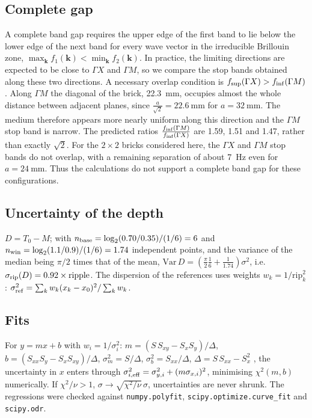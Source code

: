 \documentclass[9pt,a4paper,twocolumn]{extarticle}
\newcommand{\GX}{\ensuremath{\Gamma X}}
\newcommand{\GM}{\ensuremath{\Gamma M}}
\begin{document}
\subsection*{Complete gap}
A complete band gap requires the upper edge of the first band to lie below the lower edge of the next band for every wave vector in the irreducible Brillouin zone, $\max_{\mathbf k} f_1(\mathbf k) < \min_{\mathbf k} f_2(\mathbf k)$. In practice, the limiting directions are expected to be close to \GX{} and \GM{}, so we compare the stop bands obtained along these two directions. A necessary overlap condition is $f_{\rm sup}(\GX) > f_{\rm inf}(\GM)$. Along \GM{} the diagonal of the brick, \SI{22.3}{\milli\metre}, occupies almost the whole distance between adjacent planes, since $\frac{a}{\sqrt{2}}=\SI{22.6}{\milli\metre}$ for $a=\SI{32}{\milli\metre}$. The medium therefore appears more nearly uniform along this direction and the \GM{} stop band is narrow. The predicted ratios $\frac{f_{\rm inf}(\GM)}{f_{\rm inf}(\GX)}$ are 1.59, 1.51 and 1.47, rather than exactly \(\sqrt{2}\). For the \(2\times2\) bricks considered here, the \GX{} and \GM{} stop bands do not overlap, with a remaining separation of about \SI{7}{\hertz} even for $a=\SI{24}{\milli\metre}$. Thus the calculations do not support a complete band gap for these configurations.

\subsection*{Uncertainty of the depth}
$D=T_0-M$; with $n_{\rm base}=\log_2(0.70/0.35)/(1/6)=6$ and $n_{\rm win}=\log_2(1.1/0.9)/(1/6)=1.74$ independent points, and the variance of the median being $\pi/2$ times that of the mean, $\mathrm{Var}\,D=\left(\frac\pi2\frac16+\frac1{1.74}\right)\sigma^2$, i.e.\ $\sigma_{\rm rip}(D)=0.92\times\mathrm{ripple}$. The dispersion of the references uses weights $w_k=1/\mathrm{rip}_k^2$: $\sigma_{\rm ref}^2=\sum_kw_k(x_k-x_0)^2/\sum_kw_k$.

\subsection*{Fits}
For $y=mx+b$ with $w_i=1/\sigma_i^2$: $m=(S\,S_{xy}-S_xS_y)/\Delta$, $b=(S_{xx}S_y-S_xS_{xy})/\Delta$, $\sigma_m^2=S/\Delta$, $\sigma_b^2=S_{xx}/\Delta$, $\Delta=S\,S_{xx}-S_x^2$ \cite{bev}, the uncertainty in $x$ enters through $\sigma_{i,\rm eff}^2=\sigma_{y,i}^2+(m\sigma_{x,i})^2$, minimising $\chi^2(m,b)$ numerically. If $\chi^2/\nu>1$, $\sigma\to\sqrt{\chi^2/\nu}\,\sigma$, uncertainties are never shrunk. The regressions were checked against \texttt{numpy.polyfit}, \texttt{scipy.optimize.curve\_fit} and \texttt{scipy.odr}.
\end{document}
